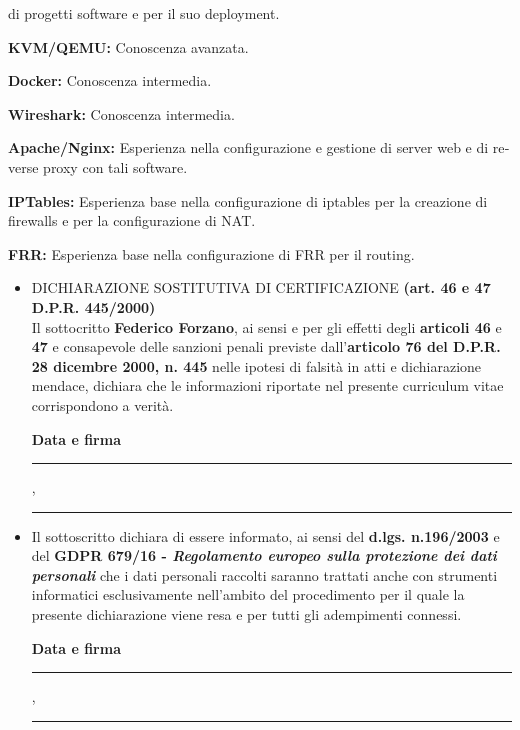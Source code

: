 \documentclass[
    italian,
    a4paper,
    nologo,
    notitle
]{europasscv}
\newcommand{\englishText}[1]{\foreignlanguage{english}{#1}}
\begin{document}
\begin{europasscv}
{\begin{ecvitemize}
            di progetti software e per il suo \englishText{deployment}.
            \item \textbf{KVM/QEMU:} Conoscenza avanzata.
            \item \textbf{Docker:} Conoscenza intermedia.
            \item \textbf{Wireshark:} Conoscenza intermedia.
            \item \textbf{Apache/Nginx:} Esperienza nella configurazione e
            gestione di server web e di \englishText{reverse proxy} con tali
            software.
            \item \textbf{IPTables:} Esperienza base nella configurazione di
            iptables per la creazione di firewalls e per la configurazione di
            NAT.
            \item \textbf{FRR:} Esperienza base nella configurazione di FRR per
            il routing.
        \end{ecvitemize}
    }

    \ecvlanguageheader
    \ecvlanguagefooter
\end{europasscv}
\vspace{1cm}
\newpage
\textcolor{ecvtextcolor}{
    \begin{itemize}
        \selectfont
        \item DICHIARAZIONE SOSTITUTIVA DI CERTIFICAZIONE \textbf{(art. 46 e 47 D.P.R. 445/2000)}\\
              Il sottocritto \textbf{Federico Forzano}, ai sensi e per gli effetti degli \textbf{articoli 46} e \textbf{47} e
              consapevole delle sanzioni penali previste dall'\textbf{articolo 76 del D.P.R. 28 dicembre 2000, n. 445} nelle ipotesi di
              falsità in atti e dichiarazione mendace, dichiara che le informazioni riportate nel presente curriculum vitae
              corrispondono a verità.
              \begin{flushright}
                  \textbf{Data e firma}\vspace{0.5cm}\\
                  \rule{0.2\textwidth}{0.4pt}, \rule{0.3\textwidth}{0.4pt}
              \end{flushright}
        \item Il sottoscritto dichiara di essere informato, ai sensi del \textbf{d.lgs. n.196/2003} e
              del \textbf{GDPR 679/16 - \emph{Regolamento europeo sulla protezione dei dati personali}} che i dati personali raccolti saranno trattati anche
              con strumenti informatici esclusivamente nell'ambito del procedimento per il
              quale la presente dichiarazione viene resa e per tutti gli adempimenti connessi.
              \begin{flushright}
                  \textbf{Data e firma}\vspace{0.5cm}\\
                  \rule{0.2\textwidth}{0.4pt}, \rule{0.3\textwidth}{0.4pt}
              \end{flushright}
    \end{itemize}
}
\end{document}
